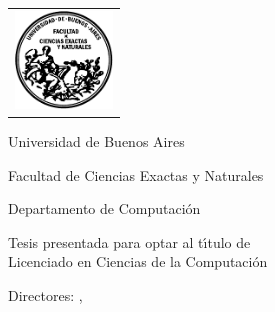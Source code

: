 
\newcommand{\HRule}{\rule{\linewidth}{0.2mm}}
%
\thispagestyle{empty}

\begin{center}\leavevmode

\vspace{-2cm}

\begin{tabular}{l}
\includegraphics[width=2.6cm]{logofcen.pdf}
\end{tabular}


{\large \sc Universidad de Buenos Aires

Facultad de Ciencias Exactas y Naturales

Departamento de Computaci\'on}

\vspace{6.0cm}


{\huge\bf \titulo}

\vspace{2cm}

{\large Tesis presentada para optar al t\'{\i}tulo de\\
Licenciado en Ciencias de la Computaci\'on}

\vspace{2cm}

{\Large \autor}

\end{center}

\vfill

{\large

{Directores: \director, \codirector}

\vspace{.2cm}

\lugar
}

\newpage\thispagestyle{empty}
